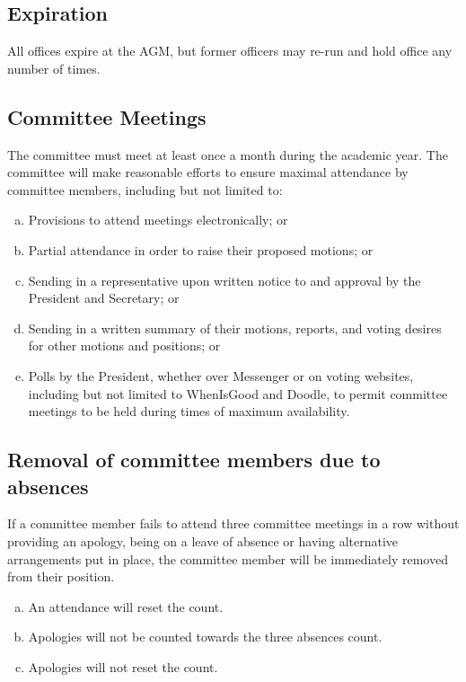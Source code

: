 \documentclass[11pt]{article}
\begin{document}
\subsection{Expiration}
All offices expire at the AGM, but former officers may re-run and hold office any number of times.

\subsection{Committee Meetings}
The committee must meet at least once a month during the academic year. The committee will make reasonable efforts to ensure maximal attendance by committee members, including but not limited to:
\begin{enumerate}[(a)]
    \item Provisions to attend meetings electronically; or
    \item Partial attendance in order to raise their proposed motions; or
    \item Sending in a representative upon written notice to and approval by the President and Secretary; or
    \item Sending in a written summary of their motions, reports, and voting desires for other motions and positions; or
    \item Polls by the President, whether over Messenger or on voting websites, including but not limited to WhenIsGood and Doodle, to permit committee meetings to be held during times of maximum availability.
\end{enumerate}

\subsection{Removal of committee members due to absences} \label{committeeRemovalAbsences}
If a committee member fails to attend three committee meetings in a row without providing an apology, being on a leave of absence or having alternative arrangements put in place, the committee member will be immediately removed from their position. 
\begin{enumerate}[(a)]
    \item An attendance will reset the count.
    \item Apologies will not be counted towards the three absences count.
    \item Apologies will not reset the count.
\end{enumerate}
\end{document}
